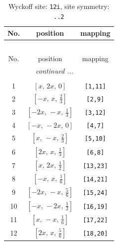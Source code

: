 \documentclass[fleqn,8pt]{jsarticle}
\begin{document}
\begin{longtable}{ccc}
\caption{Wyckoff site: {\tt 12i}, site symmetry: {\tt ..2}}
 \\
 \hline \hline
No. & position & mapping \\ \hline \endfirsthead

\multicolumn{2}{l}{\tablename\ \thetable{}} \\
 \hline \hline
No. & position & mapping \\ \hline \endhead

 \hline \hline
\multicolumn{2}{r}{\footnotesize\it continued ...} \\ \endfoot

 \hline \hline
\multicolumn{2}{r}{} \\ \endlastfoot

1 & $\left[ x,\, 2 x,\, 0 \right]$ & {\tt [1,11]} \\ \hline
2 & $\left[ - x,\, x,\, \frac{2}{3} \right]$ & {\tt [2,9]} \\ \hline
3 & $\left[ - 2 x,\, - x,\, \frac{1}{3} \right]$ & {\tt [3,12]} \\ \hline
4 & $\left[ - x,\, - 2 x,\, 0 \right]$ & {\tt [4,7]} \\ \hline
5 & $\left[ x,\, - x,\, \frac{2}{3} \right]$ & {\tt [5,10]} \\ \hline
6 & $\left[ 2 x,\, x,\, \frac{1}{3} \right]$ & {\tt [6,8]} \\ \hline
7 & $\left[ x,\, 2 x,\, \frac{1}{2} \right]$ & {\tt [13,23]} \\ \hline
8 & $\left[ - x,\, x,\, \frac{1}{6} \right]$ & {\tt [14,21]} \\ \hline
9 & $\left[ - 2 x,\, - x,\, \frac{5}{6} \right]$ & {\tt [15,24]} \\ \hline
10 & $\left[ - x,\, - 2 x,\, \frac{1}{2} \right]$ & {\tt [16,19]} \\ \hline
11 & $\left[ x,\, - x,\, \frac{1}{6} \right]$ & {\tt [17,22]} \\ \hline
12 & $\left[ 2 x,\, x,\, \frac{5}{6} \right]$ & {\tt [18,20]} \\
\end{longtable}
\renewcommand{\arraystretch}{1.2}
\end{document}
